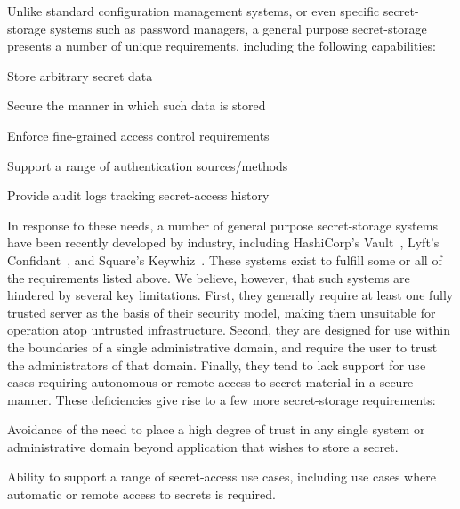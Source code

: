 Unlike standard configuration management systems, or even specific
secret-storage systems such as password managers, a general purpose
secret-storage presents a number of unique requirements, including the
following capabilities:

\begin{packed_item}
\item Store arbitrary secret data
\item Secure the manner in which such data is stored
\item Enforce fine-grained access control requirements
\item Support a range of authentication sources/methods
\item Provide audit logs tracking secret-access history
\end{packed_item}

In response to these needs, a number of general purpose secret-storage
systems have been recently developed by industry, including
HashiCorp's Vault~\cite{vault}, Lyft's Confidant~\cite{confidant}, and
Square's Keywhiz~\cite{keywhiz}. These systems exist to fulfill some
or all of the requirements listed above. We believe, however, that
such systems are hindered by several key limitations. First, they
generally require at least one fully trusted server as the basis of
their security model, making them unsuitable for operation atop
untrusted infrastructure. Second, they are designed for use within the
boundaries of a single administrative domain, and require the user to
trust the administrators of that domain. Finally, they tend to lack
support for use cases requiring autonomous or remote access to secret
material in a secure manner. These deficiencies give rise to a few
more secret-storage requirements:

\begin{packed_item}
\item Avoidance of the need to place a high degree of trust in any
  single system or administrative domain beyond application that
  wishes to store a secret.
\item Ability to support a range of secret-access use cases, including
  use cases where automatic or remote access to secrets is required.
\end{packed_item}

